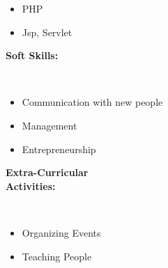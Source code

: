 \documentclass[12pt,a4paper,english]{article}
\begin{document}
\begin{flushleft}
\begin{itemize}
\begin{itemize}
				\item PHP
				\item Jsp, Servlet
			\end{itemize}
		\end{itemize}
		\vspace{1.5in}
		\begin{Large}
			\textbf{Soft Skills:}
		\end{Large}\\
		\begin{itemize}
			\item Communication with new people
			\item Management
			\item Entrepreneurship
		\end{itemize}
		\begin{Large}
			\textbf{Extra-Curricular\\\vspace{0.054in}Activities:}
		\end{Large}\\
		\begin{itemize}
			\begin{itemize}
				\item Organizing Events
				\item Teaching People
			\end{itemize}
		\end{itemize}
	\end{flushleft}
\end{document}
